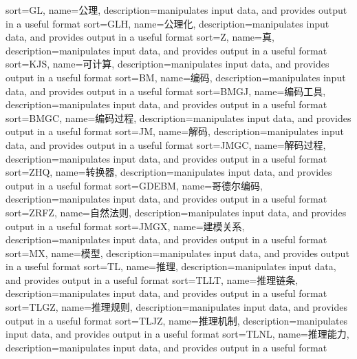 {
  sort=GL,
  name=公理,
  description={manipulates input data, and provides output in a useful format}
}
{
  sort=GLH,
  name=公理化,
  description={manipulates input data, and provides output in a useful format}
}
{
  sort=Z,
  name=真,
  description={manipulates input data, and provides output in a useful format}
}
{
  sort=KJS,
  name=可计算,
  description={manipulates input data, and provides output in a useful format}
}
{
  sort=BM,
  name=编码,
  description={manipulates input data, and provides output in a useful format}
}
{
  sort=BMGJ,
  name=编码工具,
  description={manipulates input data, and provides output in a useful format}
}
{
  sort=BMGC,
  name=编码过程,
  description={manipulates input data, and provides output in a useful format}
}
{
  sort=JM,
  name=解码,
  description={manipulates input data, and provides output in a useful format}
}
{
  sort=JMGC,
  name=解码过程,
  description={manipulates input data, and provides output in a useful format}
}
{
  sort=ZHQ,
  name=转换器,
  description={manipulates input data, and provides output in a useful format}
}
{
  sort=GDEBM,
  name=哥德尔编码,
  description={manipulates input data, and provides output in a useful format}
}
{
  sort=ZRFZ,
  name=自然法则,
  description={manipulates input data, and provides output in a useful format}
}
{
  sort=JMGX,
  name=建模关系,
  description={manipulates input data, and provides output in a useful format}
}
{
  sort=MX,
  name=模型,
  description={manipulates input data, and provides output in a useful format}
}
{
  sort=TL,
  name=推理,
  description={manipulates input data, and provides output in a useful format}
}
{
  sort=TLLT,
  name=推理链条,
  description={manipulates input data, and provides output in a useful format}
}
{
  sort=TLGZ,
  name=推理规则,
  description={manipulates input data, and provides output in a useful format}
}
{
  sort=TLJZ,
  name=推理机制,
  description={manipulates input data, and provides output in a useful format}
}
{
  sort=TLNL,
  name=推理能力,
  description={manipulates input data, and provides output in a useful format}
}
